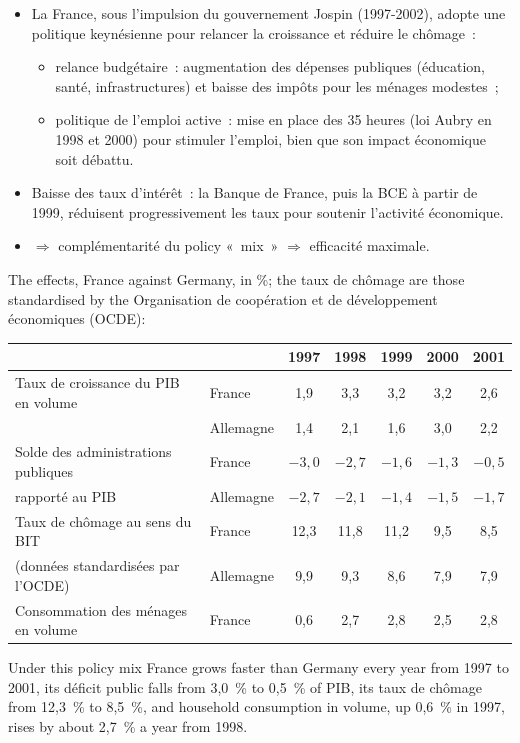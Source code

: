 \begin{itemize}
  \item La France, sous l'impulsion du gouvernement Jospin (1997-2002), adopte une
    politique keynésienne pour relancer la croissance et réduire le chômage~:
    \begin{itemize}
      \item relance budgétaire~: augmentation des dépenses publiques (éducation, santé,
        infrastructures) et baisse des impôts pour les ménages modestes~;
      \item politique de l'emploi active~: mise en place des 35 heures (loi Aubry en
        1998 et 2000) pour stimuler l'emploi, bien que son impact économique soit
        débattu.
    \end{itemize}
  \item Baisse des taux d'intérêt~: la Banque de France, puis la BCE à partir de 1999,
    réduisent progressivement les taux pour soutenir l'activité économique.
  \item $\Rightarrow$ complémentarité du policy «~mix~» $\Rightarrow$ efficacité
    maximale.
\end{itemize}

The effects, France against Germany, in \%; the taux de chômage are those
standardised by the Organisation de coopération et de développement économiques
(OCDE):
\begin{center}
  \small
  \begin{tabular}{llccccc}
    \toprule
    & & 1997 & 1998 & 1999 & 2000 & 2001 \\
    \midrule
    Taux de croissance du PIB en volume & France & 1,9 & 3,3 & 3,2 & 3,2 & 2,6 \\
    & Allemagne & 1,4 & 2,1 & 1,6 & 3,0 & 2,2 \\
    \addlinespace
    Solde des administrations publiques & France & $-3{,}0$ & $-2{,}7$ & $-1{,}6$ &
      $-1{,}3$ & $-0{,}5$ \\
    rapporté au PIB & Allemagne & $-2{,}7$ & $-2{,}1$ & $-1{,}4$ & $-1{,}5$ & $-1{,}7$
      \\
    \addlinespace
    Taux de chômage au sens du BIT & France & 12,3 & 11,8 & 11,2 & 9,5 & 8,5 \\
    (données standardisées par l'OCDE) & Allemagne & 9,9 & 9,3 & 8,6 & 7,9 & 7,9 \\
    \addlinespace
    Consommation des ménages en volume & France & 0,6 & 2,7 & 2,8 & 2,5 & 2,8 \\
    \bottomrule
  \end{tabular}
\end{center}
Under this policy mix France grows faster than Germany every year from 1997 to 2001,
its déficit public falls from 3,0~\% to 0,5~\% of PIB, its taux de chômage from 12,3~\%
to 8,5~\%, and household consumption in volume, up 0,6~\% in 1997, rises by about
2,7~\% a year from 1998.

